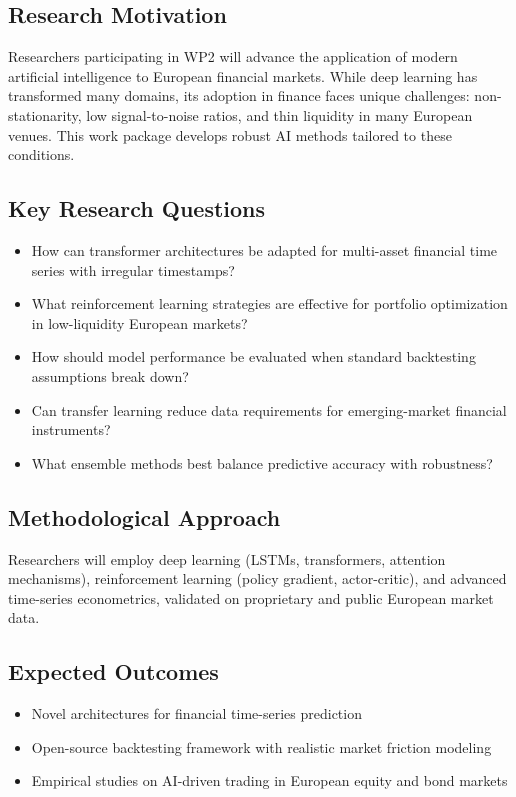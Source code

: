 \subsection*{Research Motivation}

Researchers participating in WP2 will advance the application of modern
artificial intelligence to European financial markets.  While deep learning has
transformed many domains, its adoption in finance faces unique challenges:
non-stationarity, low signal-to-noise ratios, and thin liquidity in many
European venues.  This work package develops robust AI methods tailored to these
conditions.

\subsection*{Key Research Questions}
\begin{itemize}[nosep]
  \item How can transformer architectures be adapted for multi-asset financial
        time series with irregular timestamps?
  \item What reinforcement learning strategies are effective for portfolio
        optimization in low-liquidity European markets?
  \item How should model performance be evaluated when standard backtesting
        assumptions break down?
  \item Can transfer learning reduce data requirements for emerging-market
        financial instruments?
  \item What ensemble methods best balance predictive accuracy with robustness?
\end{itemize}

\subsection*{Methodological Approach}

Researchers will employ deep learning (LSTMs, transformers, attention
mechanisms), reinforcement learning (policy gradient, actor-critic), and
advanced time-series econometrics, validated on proprietary and public European
market data.

\subsection*{Expected Outcomes}
\begin{itemize}[nosep]
  \item Novel architectures for financial time-series prediction
  \item Open-source backtesting framework with realistic market friction modeling
  \item Empirical studies on AI-driven trading in European equity and bond
        markets
\end{itemize}

